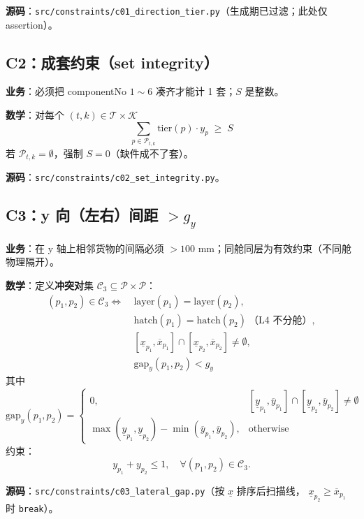 \documentclass[a4paper,11pt]{ctexart}
\newcommand{\set}[1]{\mathcal{#1}}
\begin{document}
\textbf{源码}：\texttt{src/constraints/c01\_direction\_tier.py}（生成期已过滤；此处仅 assertion）。

\subsection{C2：成套约束（set integrity）}

\textbf{业务}：必须把 componentNo $1\sim 6$ 凑齐才能计 1 套；$S$ 是整数。

\textbf{数学}：对每个 $(t,k)\in\set{T}\times\set{K}$
\begin{equation}\label{eq:c2}
\sum_{p\in\set{P}_{t,k}} \text{tier}(p)\cdot y_p \;\geq\; S
\end{equation}
若 $\set{P}_{t,k}=\emptyset$，强制 $S=0$（缺件成不了套）。

\textbf{源码}：\texttt{src/constraints/c02\_set\_integrity.py}。

\subsection{C3：y 向（左右）间距 $> g_y$}

\textbf{业务}：在 y 轴上相邻货物的间隔必须 $> 100$ mm；同舱同层为有效约束（不同舱物理隔开）。

\textbf{数学}：定义\textbf{冲突对}集 $\set{C}_3 \subseteq \set{P}\times\set{P}$：
\begin{align*}
(p_1, p_2) \in \set{C}_3 \iff\ &\text{layer}(p_1)=\text{layer}(p_2),\\
&\text{hatch}(p_1)=\text{hatch}(p_2)\ \text{（L4 不分舱）},\\
&[\underline{x}_{p_1},\overline{x}_{p_1}]\cap[\underline{x}_{p_2},\overline{x}_{p_2}]\neq\emptyset,\\
&\text{gap}_y(p_1,p_2) < g_y
\end{align*}
其中
\[
\text{gap}_y(p_1,p_2)=
\begin{cases}
0, & [\underline{y}_{p_1},\overline{y}_{p_1}]\cap[\underline{y}_{p_2},\overline{y}_{p_2}]\neq\emptyset\\
\max(\underline{y}_{p_1},\underline{y}_{p_2})-\min(\overline{y}_{p_1},\overline{y}_{p_2}),
& \text{otherwise}
\end{cases}
\]
约束：
\begin{equation}
y_{p_1}+y_{p_2}\leq 1, \quad \forall (p_1,p_2)\in\set{C}_3.
\end{equation}

\textbf{源码}：\texttt{src/constraints/c03\_lateral\_gap.py}（按 $\underline{x}$ 排序后扫描线，
$\underline{x}_{p_2}\geq\overline{x}_{p_1}$ 时 \texttt{break}）。
\end{document}
